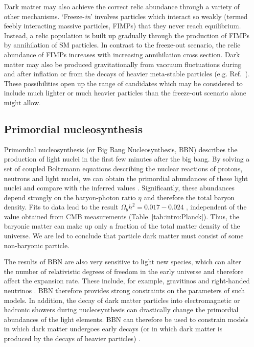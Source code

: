 Dark matter may also achieve the correct relic abundance through a variety of other mechanisms. `Freeze-\textit{in}' \cite{Hall:2009} involves particles which interact so weakly (termed feebly interacting massive particles, FIMPs) that they never reach equilibrium. Instead, a relic population is built up gradually through the production of FIMPs by annihilation of SM particles. In contrast to the freeze-out scenario, the relic abundance of FIMPs increases with increasing annihilation cross section. Dark matter may also be produced gravitationally from vaccuum fluctuations during and after inflation \cite{Chung:1998, Kuzmin:1998} or from the decays of heavier meta-stable particles (e.g. Ref.~\cite{Gherghetta:1999}). These possibilities open up the range of candidates which may be considered to include much lighter or much heavier particles than the freeze-out scenario alone might allow.


\subsection{Primordial nucleosynthesis}


Primordial nucleosynthesis (or Big Bang Nucleosynthesis, BBN) describes the production of light nuclei in the first few minutes after the big bang. By solving a set of coupled Boltzmann equations describing the nuclear reactions of protons, neutrons and light nuclei, we can obtain the primordial abundances of these light nuclei and compare with the inferred values \cite{Tytler:2000}. Significantly, these abundances depend strongly on the baryon-photon ratio $\eta$ and therefore the total baryon density. Fits to data lead to the result $\Omega_b h^2 = 0.017 - 0.024$ \cite{Fields:2006}, independent of the value obtained from CMB measurements (Table~\ref{tab:intro:Planck}). Thus, the baryonic matter can make up only a fraction of the total matter density of the universe. We are led to conclude that particle dark matter must consist of some non-baryonic particle.


The results of BBN are also very sensitive to light new species, which can alter the number of relativistic degrees of freedom in the early universe and therefore affect the expansion rate. These include, for example, gravitinos \cite{Maggiore:2000} and right-handed neutrinos \cite{Cyburt:2005}. BBN therefore provides strong constraints on the parameters of such models. In addition, the decay of dark matter particles into electromagnetic or hadronic showers during nucleosynthesis can drastically change the primordial abundances of the light elements. BBN can therefore be used to constrain models in which dark matter undergoes early decays (or in which dark matter is produced by the decays of heavier particles) \cite{Jedamzik:2006}.

